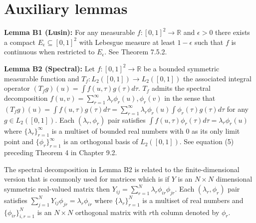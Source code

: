 \documentclass[12pt]{article}
\theoremstyle{definition}
\begin{document}
\section{Auxiliary lemmas}
\begin{flushleft}
\textbf{Lemma B1 (Lusin):} For any measurable $f: [0,1]^{2} \to \mathbb{R}$ and $\epsilon > 0$ there exists a compact $E_{\epsilon} \subseteq [0,1]^{2}$ with Lebesgue measure at least $1-\epsilon$ such that $f$ is continuous when restricted to $E_{\epsilon}$. See \cite{dudley2002real} Theorem 7.5.2.    
\end{flushleft}

\begin{flushleft}
\textbf{Lemma B2 (Spectral):}  Let $f :[0,1]^{2}\to \mathbb{R}$ be a bounded symmetric measurable function and $T_{f}: L_{2}([0,1]) \to L_{2}([0,1])$ the associated integral operator $(T_{f}g)(u) = \int f(u,\tau)g(\tau)d\tau$.  $T_{f}$ admits the spectral decomposition $f(u,v) = \sum_{r=1}^{\infty}\lambda_{r}\phi_{r}(u),\phi_{r}(v)$ in the sense that $(T_{f}g)(u) = \int f(u,\tau)g(\tau)d\tau = \sum_{r=1}^{\infty}\lambda_{r}\phi_{r}(u) \int\phi_{r}(\tau)g(\tau)d\tau$ for any $g \in L_{2}([0,1])$. Each $(\lambda_{r},\phi_{r})$ pair satisfies $\int f(u,\tau)\phi_{r}(\tau)d\tau = \lambda_{r}\phi_{r}(u)$ where $\{\lambda_{r}\}_{r=1}^{\infty}$ is a multiset of bounded real numbers with $0$ as its only limit point and $\{\phi_{r}\}_{r=1}^{\infty}$ is an orthogonal basis of $L_{2}([0,1])$. See \cite{birman2012spectral} equation (5) preceding Theorem 4 in Chapter 9.2.    
\end{flushleft}

The spectral decomposition in Lemma B2 is related to the finite-dimensional version that is commonly used for matrices which is if $Y$ is an $N\times N$ dimensional symmetric real-valued matrix then $Y_{ij} = \sum_{r=1}^{N}\lambda_{r}\phi_{ir}\phi_{jr}$. Each $(\lambda_{r},\phi_{r})$ pair satisfies $\sum_{j=1}^{N}Y_{ij}\phi_{jr} = \lambda_{r}\phi_{ir}$ where $\{\lambda_{r}\}_{r=1}^{N}$ is a multiset of real numbers and $\{\phi_{ir}\}_{i,r=1}^{N}$ is an $N \times N$ orthogonal matrix with $r$th column denoted by $\phi_{r}$.    
\end{document}
